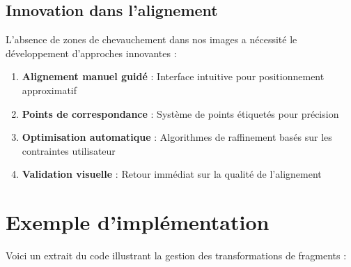 \documentclass[11pt,a4paper]{report}
\begin{document}
\subsection{Innovation dans l'alignement}

L'absence de zones de chevauchement dans nos images a nécessité le développement d'approches innovantes :

\begin{enumerate}
\item \textbf{Alignement manuel guidé} : Interface intuitive pour positionnement approximatif
\item \textbf{Points de correspondance} : Système de points étiquetés pour précision
\item \textbf{Optimisation automatique} : Algorithmes de raffinement basés sur les contraintes utilisateur
\item \textbf{Validation visuelle} : Retour immédiat sur la qualité de l'alignement
\end{enumerate}

\section{Exemple d'implémentation}

Voici un extrait du code illustrant la gestion des transformations de fragments :
\end{document}
